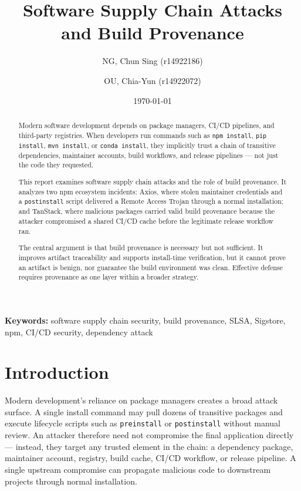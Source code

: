 \documentclass[12pt,a4paper]{article}
\title{\bfseries Software Supply Chain Attacks and Build Provenance\\}
\author{NG, Chun Sing (r14922186) \and OU, Chia-Yun (r14922072)}
\date{\today}
\begin{document}
\maketitle

\begin{abstract}
Modern software development depends on package managers, CI/CD pipelines, and third-party registries. When developers run commands such as \texttt{npm install}, \texttt{pip install}, \texttt{mvn install}, or \texttt{conda install}, they implicitly trust a chain of transitive dependencies, maintainer accounts, build workflows, and release pipelines --- not just the code they requested.

This report examines software supply chain attacks and the role of build provenance. It analyzes two npm ecosystem incidents: Axios, where stolen maintainer credentials and a \texttt{postinstall} script delivered a Remote Access Trojan through a normal installation; and TanStack, where malicious packages carried valid build provenance because the attacker compromised a shared CI/CD cache before the legitimate release workflow ran.

The central argument is that build provenance is necessary but not sufficient. It improves artifact traceability and supports install-time verification, but it cannot prove an artifact is benign, nor guarantee the build environment was clean. Effective defense requires provenance as one layer within a broader strategy.
\end{abstract}

\noindent\textbf{Keywords:} software supply chain security, build provenance, SLSA, Sigstore, npm, CI/CD security, dependency attack

\section{Introduction}

Modern development's reliance on package managers creates a broad attack surface. A single install command may pull dozens of transitive packages and execute lifecycle scripts such as \texttt{preinstall} or \texttt{postinstall} without manual review. An attacker therefore need not compromise the final application directly --- instead, they target any trusted element in the chain: a dependency package, maintainer account, registry, build cache, CI/CD workflow, or release pipeline. A single upstream compromise can propagate malicious code to downstream projects through normal installation.
\end{document}
